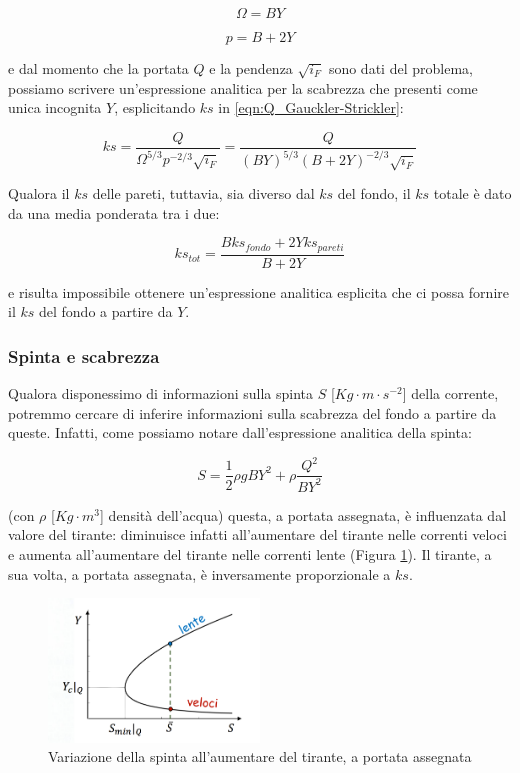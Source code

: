 \documentclass[12pt]{article} %
\begin{document}
\begin{equation}
    \Omega=BY
\end{equation}

\begin{equation}
    p=B+2Y
\end{equation}

\noindent e dal momento che la portata $Q$ e la pendenza $\sqrt{i_F}$ sono dati del problema, possiamo scrivere un'espressione analitica per la scabrezza che presenti come unica incognita $Y$, esplicitando $ks$ in \ref{eqn:Q_Gauckler-Strickler}:

\begin{equation}
    ks=\frac{Q}{\Omega^{5/3}p^{-2/3}\sqrt{i_F}}=\frac{Q}{(BY)^{5/3}(B+2Y)^{-2/3}\sqrt{i_F}}
\end{equation}

\noindent Qualora il $ks$ delle pareti, tuttavia, sia diverso dal $ks$ del fondo, il $ks$ totale è dato da una media ponderata tra i due:

\begin{equation}
    ks_{tot} = \frac{Bks_{fondo} + 2Yks_{pareti}}{B+2Y}
\end{equation}

\noindent e risulta impossibile ottenere un'espressione analitica esplicita che ci possa fornire il $ks$ del fondo a partire da $Y$.

\subsubsection{Spinta e scabrezza}
\noindent Qualora disponessimo di informazioni sulla spinta $S$ [$Kg\cdot m\cdot s^{-2}$] della corrente, potremmo cercare di inferire informazioni sulla scabrezza del fondo a partire da queste. Infatti, come possiamo notare dall'espressione analitica della spinta:

\begin{equation}
    S=\frac{1}{2}\rho gBY^2+\rho\frac{Q^2}{BY^2}
    \label{eqn:S}
\end{equation}

\noindent (\noindent con $\rho$ [$Kg\cdot m^3$] densità dell'acqua) questa, a portata assegnata, è influenzata dal valore del tirante: diminuisce infatti all'aumentare del tirante nelle correnti veloci e aumenta all'aumentare del tirante nelle correnti lente (Figura \ref{fig:spinta}). Il tirante, a sua volta, a portata assegnata, è inversamente proporzionale a $ks$.

\begin{figure}
    \centering
    \includegraphics[width=0.5\textwidth]{Spinta.png}
    \caption{Variazione della spinta all'aumentare del tirante, a portata assegnata}
    \label{fig:spinta}
\end{figure}
\end{document}
